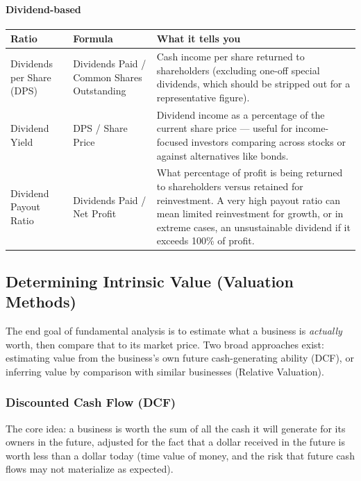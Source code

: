 \documentclass[12pt,openany]{book}
\begin{document}
\paragraph{Dividend-based} 

\begingroup
\small
\setlength{\tabcolsep}{4pt}
\begin{center}\begin{tabular}{|L{0.22\textwidth}|L{0.24\textwidth}|L{0.42\textwidth}|}
\hline
\textbf{Ratio} & \textbf{Formula} & \textbf{What it tells you} \\
\hline
Dividends per Share (DPS) & Dividends Paid / Common Shares Outstanding & Cash income per share returned to shareholders (excluding one-off special dividends, which should be stripped out for a representative figure). \\
\hline
Dividend Yield & DPS / Share Price & Dividend income as a percentage of the current share price --- useful for income-focused investors comparing across stocks or against alternatives like bonds. \\
\hline
Dividend Payout Ratio & Dividends Paid / Net Profit & What percentage of profit is being returned to shareholders versus retained for reinvestment. A very high payout ratio can mean limited reinvestment for growth, or in extreme cases, an unsustainable dividend if it exceeds 100\% of profit. \\
\hline
\end{tabular}\end{center}
\endgroup

\subsection{Determining Intrinsic Value (Valuation Methods)}

The end goal of fundamental analysis is to estimate what a business is \emph{actually} worth, then compare that to its market price. Two broad approaches exist: estimating value from the business's own future cash-generating ability (DCF), or inferring value by comparison with similar businesses (Relative Valuation).

\subsubsection{Discounted Cash Flow (DCF)}

The core idea: a business is worth the sum of all the cash it will generate for its owners in the future, adjusted for the fact that a dollar received in the future is worth less than a dollar today (time value of money, and the risk that future cash flows may not materialize as expected).
\end{document}
